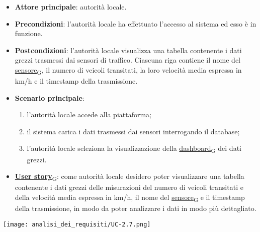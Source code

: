 \newpage
{}
\begin{itemize}
	\item \textbf{Attore principale}: autorità locale.
	\item \textbf{Precondizioni}: l'autorità locale ha effettuato l'accesso al sistema ed esso è in funzione.
	\item \textbf{Postcondizioni}: l'autorità locale visualizza una tabella contenente i dati grezzi trasmessi dai sensori di traffico.
	      Ciascuna riga contiene il nome del \href{https://7last.github.io/docs/pb/documentazione-interna/glossario\#sensore}{sensore\textsubscript{G}}, il numero di veicoli transitati, la loro velocità media espressa in km/h e il timestamp della trasmissione.
	\item \textbf{Scenario principale}:
	      \begin{enumerate}
		      \item l'autorità locale accede alla piattaforma;
		      \item il sistema carica i dati trasmessi dai sensori interrogando il database;
		      \item l'autorità locale seleziona la visualizzazione della \href{https://7last.github.io/docs/pb/documentazione-interna/glossario\#dashboard}{dashboard\textsubscript{G}} dei dati grezzi.
	      \end{enumerate}
	\item \href{https://7last.github.io/docs/pb/documentazione-interna/glossario\#user-story}{\textbf{User story}\textsubscript{G}}:
	      come autorità locale desidero poter visualizzare una tabella contenente i dati grezzi delle misurazioni del numero di veicoli transitati
	      e della velocità media espressa in km/h, il nome del \href{https://7last.github.io/docs/pb/documentazione-interna/glossario\#sensore}{sensore\textsubscript{G}} e il timestamp della trasmissione, in modo da poter analizzare i dati in modo più dettagliato.
\end{itemize}
\begin{center}
	\texttt{[image: analisi\_dei\_requisiti/UC-2.7.png]}
\end{center}

